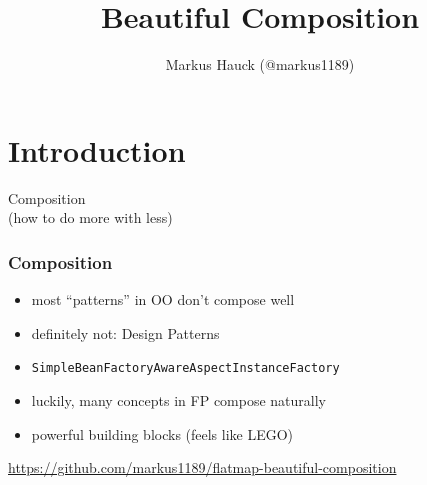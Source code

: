 \documentclass[aspectratio=169]{beamer}
\title{Beautiful Composition}
\author{Markus Hauck (@markus1189)}
\begin{document}
\begin{frame}
  \titlepage{}
\end{frame}

\section{Introduction}\label{sec:introduction}

\begin{frame}
  \begin{center}
    {\Huge Composition\\}
    (how to do more with less)
  \end{center}
\end{frame}

\begin{frame}
  \frametitle{Composition}
  \begin{itemize}
  \item most ``patterns'' in OO don't compose well
  \item definitely not: Design Patterns
  \item \texttt{SimpleBeanFactoryAwareAspectInstanceFactory}
  \item luckily, many concepts in FP compose naturally
  \item powerful building blocks (feels like LEGO)
  \end{itemize}
  \vfill
  \url{https://github.com/markus1189/flatmap-beautiful-composition}
\end{frame}
\end{document}
